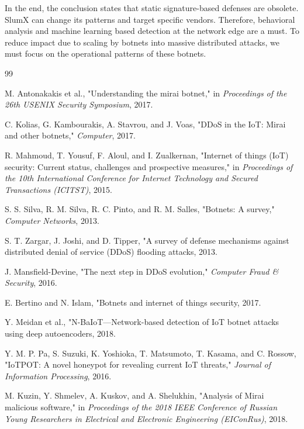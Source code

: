 \documentclass[12pt,letterpaper]{report}
\begin{document}
In the end, the conclusion states that static signature-based defenses are obsolete. SlumX can change its patterns and target specific vendors. Therefore, behavioral analysis and machine learning based detection at the network edge are a must. To reduce impact due to scaling by botnets into massive distributed attacks, we must focus on the operational patterns of these botnets.

\begin{thebibliography}{99}

M. Antonakakis et al., "Understanding the mirai botnet," in \emph{Proceedings of the 26th USENIX Security Symposium}, 2017.

C. Kolias, G. Kambourakis, A. Stavrou, and J. Voas, "DDoS in the IoT: Mirai and other botnets," \emph{Computer}, 2017.

R. Mahmoud, T. Yousuf, F. Aloul, and I. Zualkernan, "Internet of things (IoT) security: Current status, challenges and prospective measures," in \emph{Proceedings of the 10th International Conference for Internet Technology and Secured Transactions (ICITST)}, 2015.

S. S. Silva, R. M. Silva, R. C. Pinto, and R. M. Salles, "Botnets: A survey," \emph{Computer Networks}, 2013.

S. T. Zargar, J. Joshi, and D. Tipper, "A survey of defense mechanisms against distributed denial of service (DDoS) flooding attacks, 2013.

J. Mansfield-Devine, "The next step in DDoS evolution," \emph{Computer Fraud \& Security}, 2016.

E. Bertino and N. Islam, "Botnets and internet of things security, 2017.

Y. Meidan et al., "N-BaIoT—Network-based detection of IoT botnet attacks using deep autoencoders, 2018.

Y. M. P. Pa, S. Suzuki, K. Yoshioka, T. Matsumoto, T. Kasama, and C. Rossow, "IoTPOT: A novel honeypot for revealing current IoT threats," \emph{Journal of Information Processing},  2016.

M. Kuzin, Y. Shmelev, A. Kuskov, and A. Shelukhin, "Analysis of Mirai malicious software," in \emph{Proceedings of the 2018 IEEE Conference of Russian Young Researchers in Electrical and Electronic Engineering (EIConRus)}, 2018.


\end{thebibliography}
\end{document}
